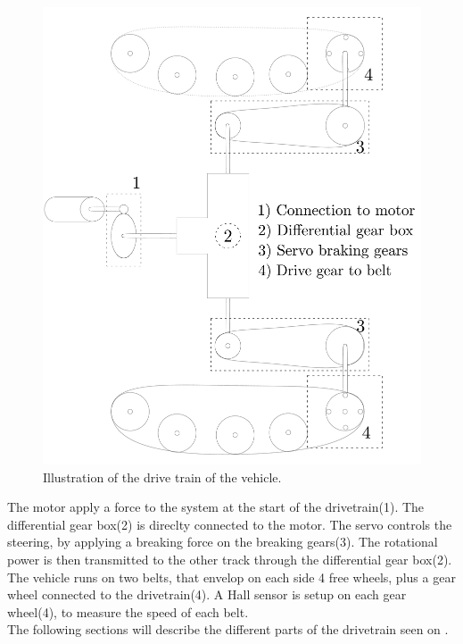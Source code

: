 \begin{figure}[H]
	\centering
	\includegraphics[scale=0.2]{figures/vehicleDescriptionDriveTrain.pdf}
	\caption{Illustration of the drive train of the vehicle.}
	\label{vehicleDescriptionDriveTrain}
\end{figure}

The motor apply a force to the system at the start of the drivetrain(1). The differential gear box(2) is direclty connected to the motor. The servo controls the steering, by applying a breaking force on the breaking gears(3). The rotational power is then transmitted to the other track through the differential gear box(2). The vehicle runs on two belts, that envelop on each side 4 free wheels, plus a gear wheel connected to the drivetrain(4). A Hall sensor is setup on each gear wheel(4), to measure the speed of each belt.\\
The following sections will describe the different parts of the drivetrain seen on .\\